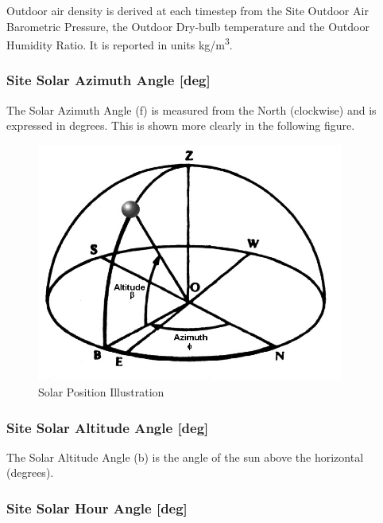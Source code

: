 Outdoor air density is derived at each timestep from the Site Outdoor Air Barometric Pressure, the Outdoor Dry-bulb temperature and the Outdoor Humidity Ratio. It is reported in units \si{kg/m^3}.

\subsubsection{Site Solar Azimuth Angle {[}deg{]}}\label{site-solar-azimuth-angle-deg}

The Solar Azimuth Angle (f) is measured from the North (clockwise) and is expressed in degrees. This is shown more clearly in the following figure.

\begin{figure}[hbtp] %
\centering
\includegraphics[width=0.9\textwidth, height=0.9\textheight, keepaspectratio=true]{media/image020.png}
\caption{Solar Position Illustration \protect \label{fig:solar-position-illustration}}
\end{figure}

\subsubsection{Site Solar Altitude Angle {[}deg{]}}\label{site-solar-altitude-angle-deg}

The Solar Altitude Angle (b) is the angle of the sun above the horizontal (degrees).

\subsubsection{Site Solar Hour Angle {[}deg{]}}\label{site-solar-hour-angle-deg}

